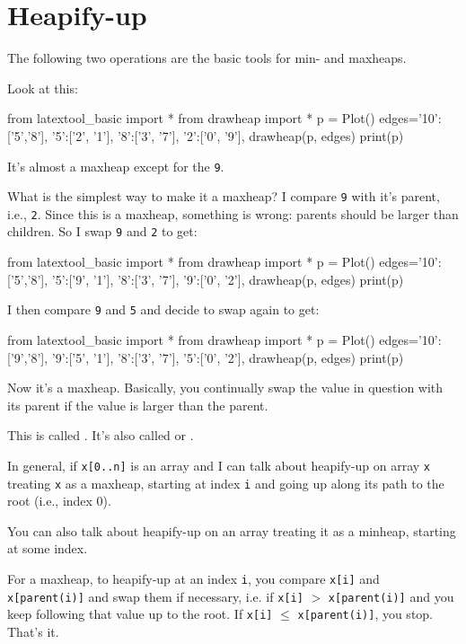 \section{Heapify-up}

The following two operations are the basic tools for min- and maxheaps.

Look at this:

\begin{python}
from latextool_basic import *
from drawheap import *  
p = Plot()
edges={'10':['5','8'],
       '5':['2', '1'],
       '8':['3', '7'],
       '2':['0', '9'],
       }
drawheap(p, edges)
print(p)
\end{python}

It's almost a maxheap except for the \verb!9!.

What is the simplest way to make it a maxheap?
I compare \verb!9! with it's parent, i.e., \verb!2!.
Since this is a maxheap, something is wrong:
parents should be larger than children.
So I swap \verb!9! and \verb!2! to get:

\begin{python}
from latextool_basic import *
from drawheap import *  
p = Plot()
edges={'10':['5','8'],
       '5':['9', '1'],
       '8':['3', '7'],
       '9':['0', '2'],
       }
drawheap(p, edges)
print(p)
\end{python}

I then compare \verb!9! and \verb!5! and decide to swap again to get:

\begin{python}
from latextool_basic import *
from drawheap import *  
p = Plot()
edges={'10':['9','8'],
       '9':['5', '1'],
       '8':['3', '7'],
       '5':['0', '2'],
       }
drawheap(p, edges)
print(p)
\end{python}

Now it's a maxheap.
Basically, you continually swap the value in question with
its parent if the value is larger than the parent.

This is called
.
It's also called
 or
.


In general, if \verb!x[0..n]! is an array
and I can talk about heapify-up on array \verb!x!
treating \verb!x! as a maxheap,
starting at index \verb!i! and going up
along its path to the root (i.e., index 0).

You can also talk about heapify-up on an array
treating it as a minheap,
starting at some index.

For a maxheap, to heapify-up at an index \verb!i!, you compare
\verb!x[i]! and \verb!x[parent(i)]!
and swap them if necessary, i.e. if \verb!x[i]! $>$ \verb!x[parent(i)]!
and you keep following that value up to the root.
If \verb!x[i]! $\leq$ \verb!x[parent(i)]!, you stop.
That's it.

